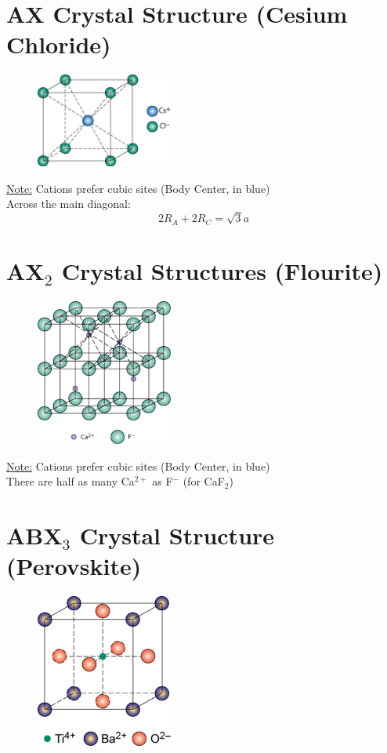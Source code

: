 \documentclass[12pt]{article}
\begin{document}
\section*{AX Crystal Structure (Cesium Chloride)}
\begin{figure}[H]
    \centering
    \includegraphics[width=0.4\textwidth]{AX.png}
\end{figure}
\underline{Note:} Cations prefer cubic sites (Body Center, in blue) \\
Across the main diagonal:
\[2R_A+2R_C=\sqrt{3}a\]
\section*{AX$_2$ Crystal Structures (Flourite)}
\begin{figure}[H]
    \centering
    \includegraphics[width=0.4\textwidth]{AX2.png}
\end{figure}
\underline{Note:} Cations prefer cubic sites (Body Center, in blue) \\
There are half as many Ca$^{2+}$ as F$^-$ (for CaF$_2$)
\section*{ABX$_3$ Crystal Structure (Perovskite)}
\begin{figure}[H]
    \centering
    \includegraphics[width=0.4\textwidth]{ABX3.png}
\end{figure}
\end{document}
